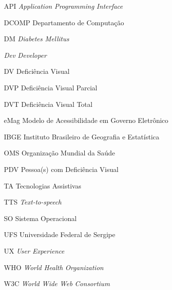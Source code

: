 
\begin{siglas}
  	\item[API]{\textit{Application Programming Interface}}
  	\item[DCOMP]{Departamento de Computação}
  	\item[DM]{\textit{Diabetes Mellitus}}
  	\item[\emph{Dev}]{\textit{Developer}}
  	\item[DV]{Deficiência Visual}
  	\item[DVP]{Deficiência Visual Parcial}
  	\item[DVT]{Deficiência Visual Total}
  	\item[eMag]{Modelo de Acessibilidade em Governo Eletrônico}
  	\item[IBGE]{Instituto Brasileiro de Geografia e Estatística}
  	\item[OMS]{Organização Mundial da Saúde}
  	\item[PDV]{Pessoa(s) com Deficiência Visual}
  	\item[TA]{Tecnologias Assistivas}
  	\item[TTS]{\textit{Text-to-speech}}
  	\item[SO]{Sistema Operacional}
	\item[UFS]{Universidade Federal de Sergipe}
  	\item[UX]{\textit{User Experience}}
  	\item[WHO]{\textit{World Health Organization}}
  	\item[W3C]{\textit{World Wide Web Consortium}}
\end{siglas}